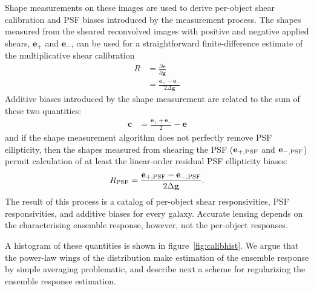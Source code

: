 \documentclass[iop]{emulateapj}
\begin{document}
Shape measurements on these images are used to derive per-object shear
calibration and PSF biases {introduced by the measurement
  process}. The shapes measured from the sheared reconvolved images
with positive and negative applied shears, $\mathbf{e}_{+}$ and
$\mathbf{e}_{-}$, can be used for a straightforward finite-difference
estimate of the multiplicative shear calibration
\begin{align}
R &= \frac{\partial \mathbf{e}}{\partial \mathbf{g}}  \\
 &=\frac{\mathbf{e}_{+} - \mathbf{e}_{-}}{2\Delta\mathbf{g}}
\end{align}
Additive biases introduced by the shape measurement are related to the
sum of these two quantities:
\begin{align}
\mathbf{c} &= \frac{\mathbf{e}_{+} + \mathbf{e}_{-}}{2} - \mathbf{e}
\end{align}
and if the shape measurement algorithm does not perfectly remove PSF
ellipticity, then the shapes measured from shearing the PSF
($\mathbf{e}_{+,\rm PSF}$ and $\mathbf{e}_{-,\rm PSF}$) permit calculation
of at least the linear-order residual PSF ellipticity biases:
\begin{align}
R_{\rm PSF} = \frac{\mathbf{e}_{+,\rm PSF} - \mathbf{e}_{-,\rm PSF}}{2\Delta\mathbf{g}}.
\end{align}
The result of this process is a catalog of per-object shear responsivities, PSF
responsivities, and additive biases for every galaxy. Accurate lensing
depends on the characterising ensemble response, however, not the
per-object responses. 

A histogram of these quantities is shown in
figure~\ref{fig:calibhist}. We argue that the power-law wings of the
distribution make estimation of the ensemble response by simple
averaging problematic, and describe next a scheme for regularizing the
ensemble response estimation.
\end{document}
